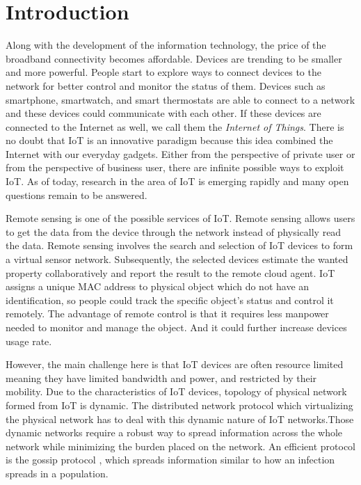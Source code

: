 \chapter{Introduction}
\label{Chapter1}

Along with the development of the information technology, the price of the broadband connectivity becomes affordable. Devices are trending to be  smaller and more powerful. People start to explore ways to connect devices to the network for better control and monitor the status of them. Devices such as smartphone, smartwatch, and smart thermostats are able to connect to a network and these devices could communicate with each other. If these devices are connected to the Internet as well, we call them the \textit{Internet of Things}. There is no doubt that IoT is an innovative paradigm \cite{Atzori} because this idea combined the Internet with our everyday gadgets. Either from the perspective of private user or from the perspective of business user, there are infinite possible ways to exploit IoT. As of today, research in the area of IoT is emerging rapidly and many open questions remain to be answered.

Remote sensing is one of the possible services of IoT. Remote sensing allows users to get the data from the device through the network instead of physically read the data. Remote sensing involves the search and selection of IoT devices to form a virtual sensor network. Subsequently, the selected devices estimate the wanted property collaboratively and report the result to the remote cloud agent. IoT assigns a unique MAC address to physical object which do not have an identification, so people could track the specific object’s status and control it remotely. The advantage of remote control is that it requires less manpower needed to monitor and manage the object. And it could further increase devices usage rate.

However, the main challenge here is that IoT devices are often resource limited meaning they have limited bandwidth and power, and restricted by their mobility. Due to the characteristics of IoT devices, topology of physical network formed from IoT is dynamic. The distributed network protocol which virtualizing the physical network has to deal with this dynamic nature of IoT networks.Those dynamic networks require a robust way to spread information across the whole network while minimizing the burden placed on the network. An efficient protocol is the gossip protocol \cite{gossip}, which spreads information similar to how an infection spreads in a population.

